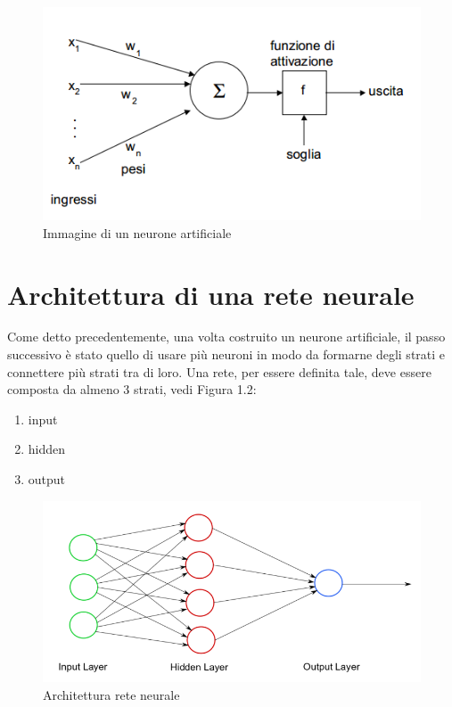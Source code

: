 \documentclass[12pt]{report}
\begin{document}
\begin{figure}
\begin{center}
\includegraphics[scale=0.75]{neurone_artificiale.png}
\caption{Immagine di un neurone artificiale}
\end{center}
\end{figure}

\section{Architettura di una rete neurale}
Come detto precedentemente, una volta costruito un neurone artificiale, il passo successivo è stato quello di usare più neuroni in modo da formarne degli strati e connettere più strati tra di loro.
Una rete, per essere definita tale, deve essere composta da almeno 3 strati, vedi Figura 1.2:
\begin{enumerate}
\item{input}
\item{hidden}
\item{output}
\end{enumerate}

\begin{figure}
\includegraphics[scale=0.5]{nn_arch.png}
\caption{Architettura rete neurale}
\end{figure}
\end{document}
